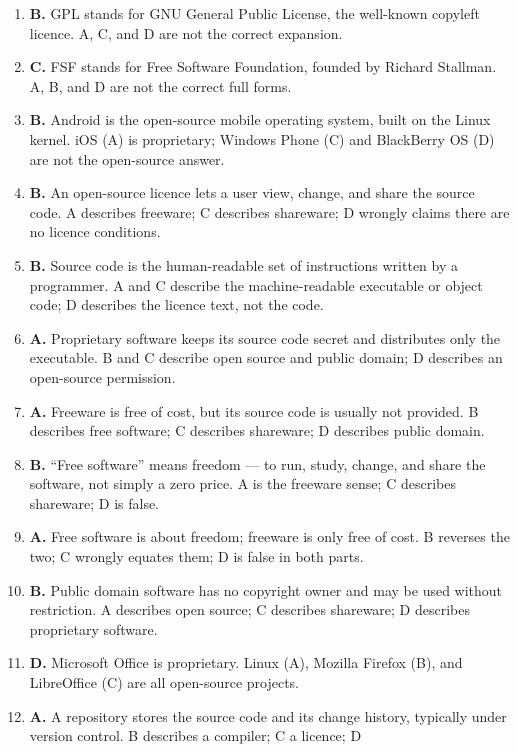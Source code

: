 \begin{enumerate}[label=\textbf{Q\arabic*.}, leftmargin=*]
\item \textbf{B.} GPL stands for GNU General Public License, the well-known
  copyleft licence. A, C, and D are not the correct expansion.
\item \textbf{C.} FSF stands for Free Software Foundation, founded by Richard
  Stallman. A, B, and D are not the correct full forms.
\item \textbf{B.} Android is the open-source mobile operating system, built on
  the Linux kernel. iOS (A) is proprietary; Windows Phone (C) and BlackBerry OS
  (D) are not the open-source answer.
\item \textbf{B.} An open-source licence lets a user view, change, and share
  the source code. A describes freeware; C describes shareware; D wrongly
  claims there are no licence conditions.
\item \textbf{B.} Source code is the human-readable set of instructions written
  by a programmer. A and C describe the machine-readable executable or object
  code; D describes the licence text, not the code.
\item \textbf{A.} Proprietary software keeps its source code secret and
  distributes only the executable. B and C describe open source and public
  domain; D describes an open-source permission.
\item \textbf{A.} Freeware is free of cost, but its source code is usually not
  provided. B describes free software; C describes shareware; D describes
  public domain.
\item \textbf{B.} ``Free software'' means freedom --- to run, study, change,
  and share the software, not simply a zero price. A is the freeware sense; C
  describes shareware; D is false.
\item \textbf{A.} Free software is about freedom; freeware is only free of
  cost. B reverses the two; C wrongly equates them; D is false in both parts.
\item \textbf{B.} Public domain software has no copyright owner and may be used
  without restriction. A describes open source; C describes shareware; D
  describes proprietary software.
\item \textbf{D.} Microsoft Office is proprietary. Linux (A), Mozilla Firefox
  (B), and LibreOffice (C) are all open-source projects.
\item \textbf{A.} A repository stores the source code and its change history,
  typically under version control. B describes a compiler; C a licence; D

\end{enumerate}
